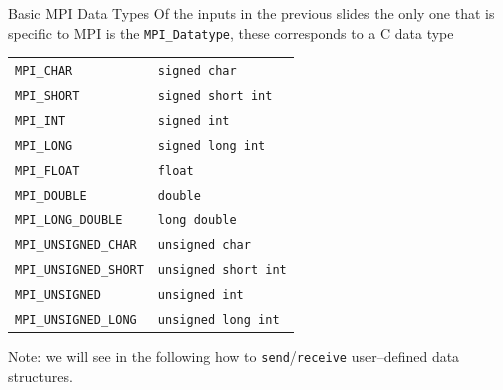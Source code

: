 \documentclass[xcolor={svgnames,usenames}]{beamer}
\begin{document}
\begin{frame}[fragile]{Basic MPI Data Types}
	Of the inputs in the previous slides the only one that is specific to MPI is the \texttt{MPI_Datatype}, these corresponds to a C data type
	\begin{center}
	\begin{tabular}{ll}
		\toprule
		\texttt{MPI_CHAR} & \texttt{signed char} \\
		\texttt{MPI_SHORT} & \texttt{signed short int} \\
		\texttt{MPI_INT} & \texttt{signed int} \\
		\texttt{MPI_LONG} & \texttt{signed long int} \\
		\texttt{MPI_FLOAT} & \texttt{float} \\
		\texttt{MPI_DOUBLE} & \texttt{double} \\
		\texttt{MPI_LONG_DOUBLE} & \texttt{long double} \\
		\midrule
		\texttt{MPI_UNSIGNED_CHAR} & \texttt{unsigned char}\\
		\texttt{MPI_UNSIGNED_SHORT} & \texttt{unsigned short int}\\
		\texttt{MPI_UNSIGNED} & \texttt{unsigned int} \\
		\texttt{MPI_UNSIGNED_LONG} & \texttt{unsigned long int} \\
		\bottomrule
	\end{tabular}
	\end{center}
	
	\alert{Note}: we will see in the following how to \texttt{send}/\texttt{receive} user--defined data structures.
\end{frame}
\end{document}
